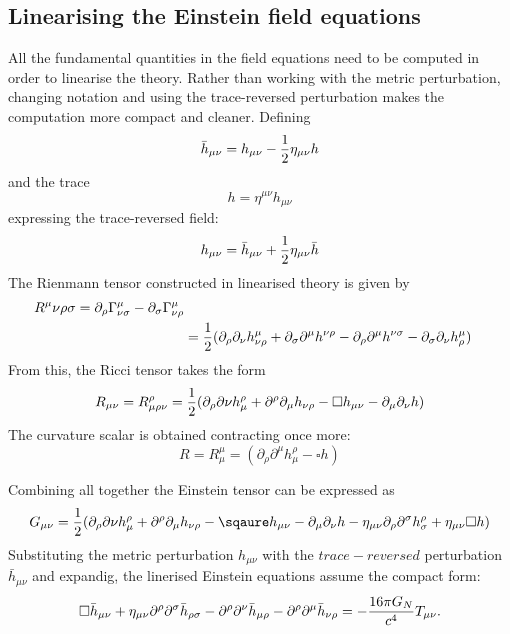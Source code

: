 \documentclass[binding=0.6cm, LaM]{sapthesis}
\begin{document}
\subsection{Linearising the Einstein field equations}
All the fundamental quantities in the field equations need to be computed in order to linearise the theory. 
Rather than working with the metric perturbation, changing notation and using the trace-reversed perturbation makes the computation more compact and cleaner. Defining 
\begin{equation}
{\bar h}_{\mu\nu} = h_{\mu\nu} - {1 \over {2}}\eta_{\mu\nu}h  
\end{equation}
and the trace 
\begin{equation}
h = \eta^{\mu\nu}h_{\mu\nu}
\end{equation}
expressing the trace-reversed field:
\begin{equation}
h_{\mu\nu} = {\bar h}_{\mu\nu} + {1 \over {2}}\eta_{\mu\nu}{\bar h}
\end{equation} 
The Rienmann tensor constructed in linearised theory is given by
\begin{align}

R^{\mu}{\nu\rho\sigma} = \partial_{\rho} \Gamma^{\mu}_{\nu\sigma} - \partial_{\sigma}\Gamma^{\mu}_{\nu\rho}  \\
&={ 1 \over 2} (\partial_{\rho}\partial_{\nu}h^{\mu}_{\nu\rho} + \partial_{\sigma}\partial^{\mu}h^{\nu\rho} - \partial_{\rho}\partial^{\mu}h^{\nu\sigma} - \partial_{\sigma}\partial_{\nu}h^{\mu}_{\rho})

\end{align}
From this, the Ricci tensor takes the form
\begin{equation}
R_{\mu\nu} = R^{\rho}_{\mu\rho\nu} = {1 \over 2}(\partial_{\rho}\partial{\nu}h^{\rho}_{\mu} + \partial^{\rho}\partial_{\mu}h_{\nu\rho} - \square h_{\mu\nu} - \partial_{\mu}\partial_{\nu}h)
\end{equation}
The curvature scalar is obtained contracting once more:
\begin{equation}
R = R^{\mu}_{\mu} = (\partial_{\rho}\partial^{\mu}h^{\rho}_{\mu} - \square h)
\end{equation}

Combining all together the Einstein tensor can be expressed as
\begin{equation}
G_{\mu\nu} = {1 \over 2}(\partial_{\rho}\partial{\nu}h^{\rho}_{\mu} + \partial^{\rho}\partial_{\mu}h_{\nu\rho} - \sqaure h_{\mu\nu} - \partial_{\mu}\partial_{\nu}h - \eta_{\mu\nu}\partial_{\rho}\partial^{\sigma}h^{\rho}_{\sigma} + \eta_{\mu\nu}\square h)
\end{equation}
Substituting the metric perturbation $h_{\mu\nu}$  with the $trace-reversed$ perturbation ${\bar h}_{\mu\nu}$ and expandig, the linerised Einstein equations assume the  compact form:
\begin{equation}
\square {\bar h}_{\mu\nu} + \eta_{\mu\nu}{\partial}^{\rho}{\partial}^{\sigma}{\bar h}_{\rho\sigma} - {\partial}^{\rho}{\partial}^{\nu}{\bar h}_{\mu\rho} - {\partial}^{\rho}{\partial}^{\mu}{\bar h}_{\nu\rho} = - {{16\pi G_{N}} \over {c^4}}T_{\mu\nu}.
\end{equation}
\end{document}
